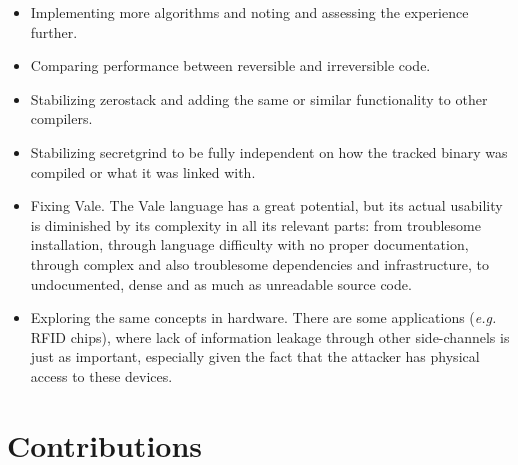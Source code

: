 \documentclass[a4paper,10pt,openright]{memoir}
\newcommand{\eg}{\emph{e.g.}\xspace}
\begin{document}
\begin{itemize}

\item Implementing more algorithms and noting and assessing the 
experience further.

\item Comparing performance between reversible and irreversible code.

\item Stabilizing zerostack and adding the same or similar 
functionality to other compilers.

\item Stabilizing secretgrind to be fully independent on how the 
tracked binary was compiled or what it was linked with.

\item Fixing Vale. The Vale language has a great potential, but its 
actual usability is diminished by its complexity in all its relevant 
parts: from troublesome installation, through language difficulty with 
no proper documentation, through complex and also troublesome 
dependencies and infrastructure, to undocumented, dense and as much as 
unreadable source code.

\item Exploring the same concepts in hardware. There are some 
applications (\eg RFID chips), where lack of information leakage 
through other side-channels is just as important, especially given the 
fact that the attacker has physical access to these devices.

\end{itemize}



\section{Contributions}
\end{document}
